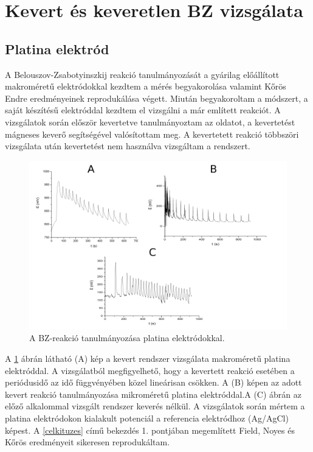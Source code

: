 \section{Kevert és keveretlen BZ vizsgálata}
\subsection{Platina elektród}
A Belouszov-Zsabotyinszkij reakció tanulmányozását a gyárilag előállított makroméretű elektródokkal kezdtem a mérés begyakorolása valamint Kőrös Endre eredményeinek \cite{noyes1972oscillations} reprodukálása végett. Miután begyakoroltam a módszert, a saját készítésű elektróddal kezdtem el vizsgálni a már említett reakciót. A vizsgálatok során először kevertetve tanulmányoztam az oldatot, a kevertetést mágneses keverő segítségével valósítottam meg. A kevertetett reakció többszöri vizsgálata után kevertetést nem használva vizsgáltam a rendszert.
\begin{figure}[h]
\centering
\includegraphics[width=1\textwidth]{img/platina_meres.png}
\caption{A BZ-reakció tanulmányozása platina elektródokkal.}
\label{fig:platina_meres}
\end{figure}
A \ref{fig:platina_meres} ábrán látható (A) kép a kevert rendszer vizsgálata makroméretű platina elektróddal. A vizsgálatból megfigyelhető, hogy a kevertett reakció esetében a periódusidő az idő függvényében közel lineárisan csökken. A (B) képen az adott kevert reakció tanulmányozása mikroméretű platina elektróddal.A (C) ábrán az előző alkalommal vizsgált rendszer keverés nélkül. A vizsgálatok során mértem a platina elektródokon kialakult potenciál a referencia elektródhoz (Ag/AgCl) képest. A \ref{celkituzes} című bekezdés 1. pontjában megemlített Field, Noyes és Kőrös eredményeit \cite{noyes1972oscillations} sikeresen reprodukáltam.  

